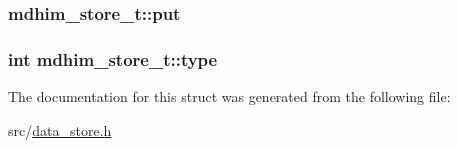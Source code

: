 \hypertarget{structmdhim__store__t_a5a33c9ea5897fdf71a54573ea49fef18}{
\subsubsection[{put}]{ mdhim\-\_\-store\-\_\-t\-::put}}\label{d1/dab/structmdhim__store__t_a5a33c9ea5897fdf71a54573ea49fef18}
\hypertarget{structmdhim__store__t_a00f8694bd01cc8cfda7479b7384e083b}{
\subsubsection[{type}]{\setlength{\rightskip}{0pt plus 5cm}int mdhim\-\_\-store\-\_\-t\-::type}}\label{d1/dab/structmdhim__store__t_a00f8694bd01cc8cfda7479b7384e083b}


The documentation for this struct was generated from the following file\-:\begin{DoxyCompactItemize}
\item 
src/\hyperlink{data__store_8h}{data\-\_\-store.\-h}\end{DoxyCompactItemize}

